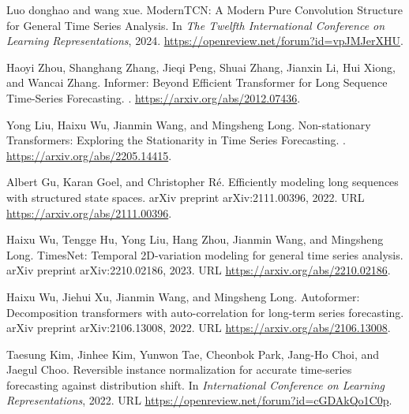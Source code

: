\documentclass[12pt,fleqn]{article}
\begin{document}
\begin{thebibliography}{9}
Luo donghao and wang xue.
\newblock Modern{TCN}: A Modern Pure Convolution Structure for General Time Series Analysis.
\newblock In \emph{The Twelfth International Conference on Learning Representations}, 2024.
\newblock \url{https://openreview.net/forum?id=vpJMJerXHU}.

Haoyi Zhou, Shanghang Zhang, Jieqi Peng, Shuai Zhang, Jianxin Li, Hui Xiong, and Wancai Zhang.
\newblock Informer: Beyond Efficient Transformer for Long Sequence Time-Series Forecasting.
.
\newblock \url{https://arxiv.org/abs/2012.07436}.

Yong Liu, Haixu Wu, Jianmin Wang, and Mingsheng Long.
\newblock Non-stationary Transformers: Exploring the Stationarity in Time Series Forecasting.
.
\newblock \url{https://arxiv.org/abs/2205.14415}.

Albert Gu, Karan Goel, and Christopher Ré.
\newblock Efficiently modeling long sequences with structured state spaces.
\newblock arXiv preprint arXiv:2111.00396, 2022.
\newblock URL \url{https://arxiv.org/abs/2111.00396}.

Haixu Wu, Tengge Hu, Yong Liu, Hang Zhou, Jianmin Wang, and Mingsheng Long.
\newblock TimesNet: Temporal 2D-variation modeling for general time series analysis.
\newblock arXiv preprint arXiv:2210.02186, 2023.
\newblock URL \url{https://arxiv.org/abs/2210.02186}.

Haixu Wu, Jiehui Xu, Jianmin Wang, and Mingsheng Long.
\newblock Autoformer: Decomposition transformers with auto-correlation for long-term series forecasting.
\newblock arXiv preprint arXiv:2106.13008, 2022.
\newblock URL \url{https://arxiv.org/abs/2106.13008}.

Taesung Kim, Jinhee Kim, Yunwon Tae, Cheonbok Park, Jang-Ho Choi, and Jaegul Choo.
\newblock Reversible instance normalization for accurate time-series forecasting against distribution shift.
\newblock In \emph{International Conference on Learning Representations}, 2022.
\newblock URL \url{https://openreview.net/forum?id=cGDAkQo1C0p}.


\end{thebibliography}
\end{document}
